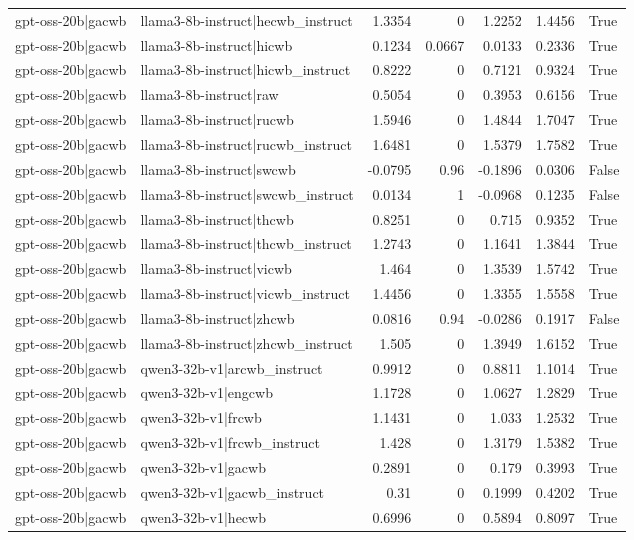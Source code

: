 \begin{table}
\begin{tabular}{l l r r r r l}
gpt-oss-20b|gacwb & llama3-8b-instruct|hecwb_instruct & 1.3354 & 0 & 1.2252 & 1.4456 & True \\
gpt-oss-20b|gacwb & llama3-8b-instruct|hicwb & 0.1234 & 0.0667 & 0.0133 & 0.2336 & True \\
gpt-oss-20b|gacwb & llama3-8b-instruct|hicwb_instruct & 0.8222 & 0 & 0.7121 & 0.9324 & True \\
gpt-oss-20b|gacwb & llama3-8b-instruct|raw & 0.5054 & 0 & 0.3953 & 0.6156 & True \\
gpt-oss-20b|gacwb & llama3-8b-instruct|rucwb & 1.5946 & 0 & 1.4844 & 1.7047 & True \\
gpt-oss-20b|gacwb & llama3-8b-instruct|rucwb_instruct & 1.6481 & 0 & 1.5379 & 1.7582 & True \\
gpt-oss-20b|gacwb & llama3-8b-instruct|swcwb & -0.0795 & 0.96 & -0.1896 & 0.0306 & False \\
gpt-oss-20b|gacwb & llama3-8b-instruct|swcwb_instruct & 0.0134 & 1 & -0.0968 & 0.1235 & False \\
gpt-oss-20b|gacwb & llama3-8b-instruct|thcwb & 0.8251 & 0 & 0.715 & 0.9352 & True \\
gpt-oss-20b|gacwb & llama3-8b-instruct|thcwb_instruct & 1.2743 & 0 & 1.1641 & 1.3844 & True \\
gpt-oss-20b|gacwb & llama3-8b-instruct|vicwb & 1.464 & 0 & 1.3539 & 1.5742 & True \\
gpt-oss-20b|gacwb & llama3-8b-instruct|vicwb_instruct & 1.4456 & 0 & 1.3355 & 1.5558 & True \\
gpt-oss-20b|gacwb & llama3-8b-instruct|zhcwb & 0.0816 & 0.94 & -0.0286 & 0.1917 & False \\
gpt-oss-20b|gacwb & llama3-8b-instruct|zhcwb_instruct & 1.505 & 0 & 1.3949 & 1.6152 & True \\
gpt-oss-20b|gacwb & qwen3-32b-v1|arcwb_instruct & 0.9912 & 0 & 0.8811 & 1.1014 & True \\
gpt-oss-20b|gacwb & qwen3-32b-v1|engcwb & 1.1728 & 0 & 1.0627 & 1.2829 & True \\
gpt-oss-20b|gacwb & qwen3-32b-v1|frcwb & 1.1431 & 0 & 1.033 & 1.2532 & True \\
gpt-oss-20b|gacwb & qwen3-32b-v1|frcwb_instruct & 1.428 & 0 & 1.3179 & 1.5382 & True \\
gpt-oss-20b|gacwb & qwen3-32b-v1|gacwb & 0.2891 & 0 & 0.179 & 0.3993 & True \\
gpt-oss-20b|gacwb & qwen3-32b-v1|gacwb_instruct & 0.31 & 0 & 0.1999 & 0.4202 & True \\
gpt-oss-20b|gacwb & qwen3-32b-v1|hecwb & 0.6996 & 0 & 0.5894 & 0.8097 & True \\

\end{tabular}
\end{table}
